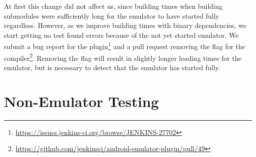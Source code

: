 At first this change did not affect us, since building times when building submodules were sufficiently long for the emulator to have started fully regardless. However, as we improve building times with binary dependencies, we start getting no test found errors because of the not yet started emulator. We submit a bug report for the plugin\footnote{\url{https://issues.jenkins-ci.org/browse/JENKINS-27702}} and a pull request removing the  flag for the compiler\footnote{\url{https://github.com/jenkinsci/android-emulator-plugin/pull/49}}. Removing the  flag will result in slightly longer loading times for the emulator, but is necessary to detect that the emulator has started fully.

\section{Non-Emulator Testing}
